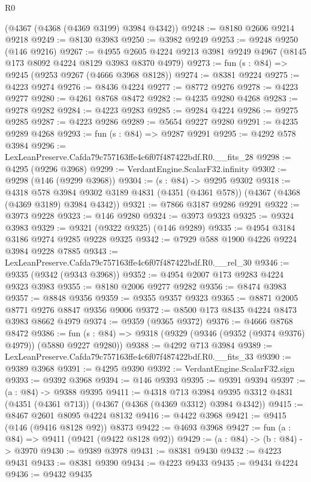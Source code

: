 \begin{lexlean}{R0}
\begin{coremodule}
    (@4367 (@4368 (@4369 @3199) @3984 @4342))
@9248 := @8180 @2606 @9214 @9218
@9249 := @8130 @3983
@9250 := @3982 @9249
@9253 := @9248 @9250 (@146 @9216)
@9267 := @4955 @2605 @4224 @9213 @3981 @9249 @4967 (@8145 @173 @8092 @4224 @8129 @3983 @8370 @4979)
@9273 := fun (s : @84) => @9245 (@9253 @9267 (@4666 @3968 @8128))
@9274 := @8381 @9224
@9275 := @4223 @9274
@9276 := @8436 @4224
@9277 := @8772 @9276
@9278 := @4223 @9277
@9280 := @4261 @8768 @8472
@9282 := @4235 @9280 @4268
@9283 := @9278 @9282
@9284 := @4223 @9283
@9285 := @9284 @4224
@9286 := @9275 @9285
@9287 := @4223 @9286
@9289 := @5654 @9227 @9280
@9291 := @4235 @9289 @4268
@9293 := fun (s : @84) => @9287 @9291
@9295 := @4292 @578 @3984
@9296 := LexLeanPreserve.Cafda79c757163ffe4c6f07f487422bdf.R0.__fits_28
@9298 := @4295 (@9296 @3968)
@9299 := VerdantEngine.ScalarF32.infinity
@9302 := @9298 (@146 (@9299 @3968))
@9304 := (s : @84) -> @9295 @9302
@9318 := @4318
    @578
    @3984
    @9302
    @3189
    @4831
    (@4351 (@4361 @578))
    (@4367 (@4368 (@4369 @3189) @3984 @4342))
@9321 := @7866 @3187 @9286 @9291
@9322 := @3973 @9228
@9323 := @146 @9280
@9324 := @3973 @9323
@9325 := @9324 @3983
@9329 := @9321 (@9322 @9325) (@146 @9289)
@9335 := @4954 @3184 @3186 @9274 @9285 @9228 @9325
@9342 := @7929 @588 @1900 @4226 @9224 @3984 @9228 @7885
@9343 := LexLeanPreserve.Cafda79c757163ffe4c6f07f487422bdf.R0.__rel_30
@9346 := @9335 (@9342 (@9343 @3968))
@9352 := @4954 @2007 @173 @9283 @4224 @9323 @3983
@9355 := @8180 @2006 @9277 @9282
@9356 := @8474 @3983
@9357 := @8848 @9356
@9359 := @9355 @9357 @9323
@9365 := @8871 @2005 @8771 @9276 @8847 @9356 @9006
@9372 := @8500 @173 @8435 @4224 @8473 @3983 @8662 @4979
@9374 := @9359 (@9365 @9372)
@9376 := @4666 @8768 @8472
@9386 := fun (s : @84) => @9318 (@9329 (@9346 (@9352 (@9374 @9376) @4979)) (@5880 @9227 @9280))
@9388 := @4292 @713 @3984
@9389 := LexLeanPreserve.Cafda79c757163ffe4c6f07f487422bdf.R0.__fits_33
@9390 := @9389 @3968
@9391 := @4295 @9390
@9392 := VerdantEngine.ScalarF32.sign
@9393 := @9392 @3968
@9394 := @146 @9393
@9395 := @9391 @9394
@9397 := (a : @84) -> @9388 @9395
@9411 := @4318
    @713
    @3984
    @9395
    @3312
    @4831
    (@4351 (@4361 @713))
    (@4367 (@4368 (@4369 @3312) @3984 @4342))
@9415 := @8467 @2601 @8095 @4224 @8132
@9416 := @4422 @3968
@9421 := @9415 (@146 (@9416 @8128 @92)) @8373
@9422 := @4693 @3968
@9427 := fun (a : @84) => @9411 (@9421 (@9422 @8128 @92))
@9429 := (a : @84) -> (b : @84) -> @3970
@9430 := @9389 @3978
@9431 := @8381 @9430
@9432 := @4223 @9431
@9433 := @8381 @9390
@9434 := @4223 @9433
@9435 := @9434 @4224
@9436 := @9432 @9435

\end{coremodule}
\end{lexlean}
